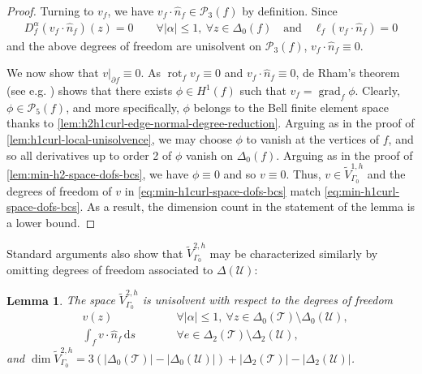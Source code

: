 \documentclass{mcom-l}
\newtheorem{lemma}[theorem]{Lemma}
\theoremstyle{definition}
\theoremstyle{remark}
\numberwithin{equation}{section}
\newcommand{\unitvec}[1]{\hat{#1}}
\renewcommand{\d}[1]{\,\mathrm{d}{#1}}
\DeclareMathOperator{\grad}{grad}
\DeclareMathOperator{\rot}{rot}
\newcommand{\mesh}[0]{\mathcal{T}}
\newcommand{\boundarymesh}[0]{\mathcal{U}}
\begin{document}
\begin{proof}
	Turning to $v_f$, we have $v_f \cdot \unitvec{n}_f \in \mathcal{P}_3(f)$
	by definition. Since 
	\begin{align*}
		D_f^{\alpha} (v_f \cdot \unitvec{n}_f)(z) = 0
		\qquad \forall |\alpha| \leq 1, \ \forall z \in \Delta_0(f) 
		\quad \text{and} \quad 
		\ell_f(v_f \cdot \unitvec{n}_f) = 0
	\end{align*}
	and the above degrees of freedom are unisolvent on $\mathcal{P}_3(f)$,
	$v_f \cdot \unitvec{n}_f \equiv 0$. 
	
	We now show that $v|_{\partial f} \equiv 0$.
	As $\rot_f v_f \equiv 0$ and 
	$v_f \cdot \unitvec{n}_f \equiv 0$, de Rham's theorem 
	(see e.g. \cite[p. 31, Theorem 2.9]{GiraultRaviart86}) 
	shows that there exists $\phi \in H^1(f)$ such that 
	$v_f = \grad_f \phi$. Clearly, $\phi \in \mathcal{P}_5(f)$,
	and more specifically, $\phi$ belongs to the Bell 
	finite element space thanks to 
	\cref{lem:h2h1curl-edge-normal-degree-reduction}. 
	Arguing as in the proof of 
	\cref{lem:h1curl-local-unisolvence}, we may choose $\phi$ to vanish 
	at the vertices of $f$, and so all derivatives up to order 2
	of $\phi$ vanish on $\Delta_0(f)$. Arguing as in the 
	proof of \cref{lem:min-h2-space-dofs-bcs}, we have $\phi \equiv 0$
	and so $v \equiv 0$.
	Thus, $v \in \tilde{V}^{1, h}_{\Gamma_0}$
	and the degrees of freedom of $v$ in \cref{eq:min-h1curl-space-dofs-bcs}
	match \cref{eq:min-h1curl-space-dofs-bcs}. As a result, 
	the dimension count
	in the statement of the lemma is a lower bound.	
\end{proof}

Standard arguments also show that $\tilde{V}_{\Gamma_0}^{2, h}$ may be
characterized similarly by omitting degrees of freedom associated to 
$\Delta(\boundarymesh)$:
\begin{lemma}
	\label{lem:min-h1-space-dofs-bcs}
	The space $\tilde{V}^{2, h}_{\Gamma_0}$ is unisolvent with respect to the 
	degrees of freedom 
	\begin{subequations}
		\label{eq:min-h1-space-dofs-bcs}
		\begin{alignat}{2}
			&v(z) \qquad 
			& &\forall |\alpha| \leq 1, \ \forall z \in \Delta_0(\mesh) 
			\setminus \Delta_0(\boundarymesh), \\
			&\int_f v \cdot \unitvec{n}_f \d{s} \qquad 
			& &\forall e \in \Delta_2(\mesh) \setminus \Delta_2(\boundarymesh), 
		\end{alignat}
	\end{subequations}
	and $\dim \tilde{V}^{2, h}_{\Gamma_0} = 
	3(|\Delta_0(\mesh)| - |\Delta_0(\boundarymesh)|)
	+ |\Delta_2(\mesh)| - |\Delta_2(\boundarymesh)|$.
\end{lemma}
\end{document}
